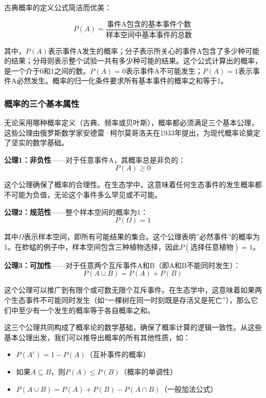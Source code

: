 \documentclass[
  twoside,12pt,fontset=none]{ctexbook}
\providecommand{\tightlist}{%
  \setlength{\itemsep}{0pt}\setlength{\parskip}{0pt}}
\begin{document}
古典概率的定义公式简洁而优美：

\[P(A) = \frac{\text{事件A包含的基本事件个数}}{\text{样本空间中基本事件的总数}}\]

其中，\(P(A)\)表示事件A发生的概率；分子表示所关心的事件A包含了多少种可能的结果；分母则表示整个试验一共有多少种可能的结果。这个公式计算出的概率，是一个介于0和1之间的数。\(P(A)=0\)表示事件A不可能发生；\(P(A)=1\)表示事件A必然发生。概率的归一化条件要求所有基本事件的概率之和等于1。

\hypertarget{ux6982ux7387ux7684ux4e09ux4e2aux57faux672cux5c5eux6027}{%
\subsubsection{概率的三个基本属性}\label{ux6982ux7387ux7684ux4e09ux4e2aux57faux672cux5c5eux6027}}

无论采用哪种概率定义（古典、频率或贝叶斯），概率都必须满足三个基本公理，这些公理由俄罗斯数学家安德雷·柯尔莫哥洛夫在1933年提出，为现代概率论奠定了坚实的数学基础。

\textbf{公理1：非负性}------对于任意事件A，其概率总是非负的：
\[P(A) \geq 0\]

这个公理确保了概率的合理性。在生态学中，这意味着任何生态事件的发生概率都不可能为负值，无论这个事件多么罕见或不可能。

\textbf{公理2：规范性}------整个样本空间的概率为1：
\[P(\Omega) = 1\]

其中\(\Omega\)表示样本空间，即所有可能结果的集合。这个公理表明''必然事件''的概率为1。在蚱蜢的例子中，样本空间包含三种植物选择，因此\(P(\text{选择任意植物}) = 1\)。

\textbf{公理3：可加性}------对于任意两个互斥事件A和B（即A和B不能同时发生）：
\[P(A \cup B) = P(A) + P(B)\]

这个公理可以推广到有限个或可数无限个互斥事件。在生态学中，这意味着如果两个生态事件不可能同时发生（如``一棵树在同一时刻既是存活又是死亡''），那么它们中至少有一个发生的概率等于各自概率之和。

这三个公理共同构成了概率论的数学基础，确保了概率计算的逻辑一致性。从这些基本公理出发，我们可以推导出概率的所有其他性质，如：

\begin{itemize}
\tightlist
\item
  \(P(A^c) = 1 - P(A)\)（互补事件的概率）
\item
  如果\(A \subseteq B\)，则\(P(A) \leq P(B)\)（概率的单调性）
\item
  \(P(A \cup B) = P(A) + P(B) - P(A \cap B)\)（一般加法公式）
\end{itemize}
\end{document}
